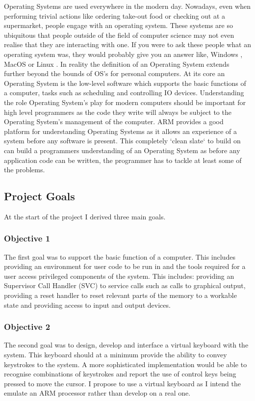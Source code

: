 Operating Systems\cite{os} are used everywhere in the modern day. Nowadays, even when performing trivial actions like ordering take-out food or checking out at a supermarket, people engage with an operating system. These systems are so ubiquitous that people outside of the field of computer science may not even realise that they are interacting with one. If you were  to ask these people what an operating system was, they would probably give you an answer like, Windows \cite{windows}, MacOS \cite{apple} or Linux \cite{linux}. In reality the definition of an Operating System extends further beyond the bounds of OS's for personal computers. At its core an Operating System is the low-level software which supports the basic functions of a computer, tasks such as scheduling and controlling IO devices. Understanding the role Operating System's play for modern computers should be important for high level programmers as the code they write will always be subject to the Operating System's management of the computer. ARM provides a good platform for understanding Operating Systems as it allows an experience of a system before any software is present. This completely `clean slate` to build on can build a programmers understanding of an Operating System as before any application code can be written, the programmer has to tackle at least some of the problems. 

\subsection{Project Goals}
At the start of the project I derived three main goals.
\subsubsection{Objective 1}
\label{obj1}
The first goal was to support the basic function of a computer. This includes providing an environment for user code to be run in and the tools required for a user access privileged components of the system. This includes: providing an Supervisor Call Handler (SVC) to service calls such as calls to graphical output, providing a reset handler to reset relevant parts of the memory to a workable state and providing access to input and output devices. 
\subsubsection{Objective 2}
\label{obj2}
The second goal was to design, develop and interface a virtual keyboard with the system. This keyboard should at a minimum provide the ability to convey keystrokes to the system. A more sophisticated implementation would be able to recognise combinations of keystrokes and report the use of control keys being pressed to move the cursor. I propose to use a virtual keyboard as I intend the emulate an ARM processor rather than develop on a real one. 

